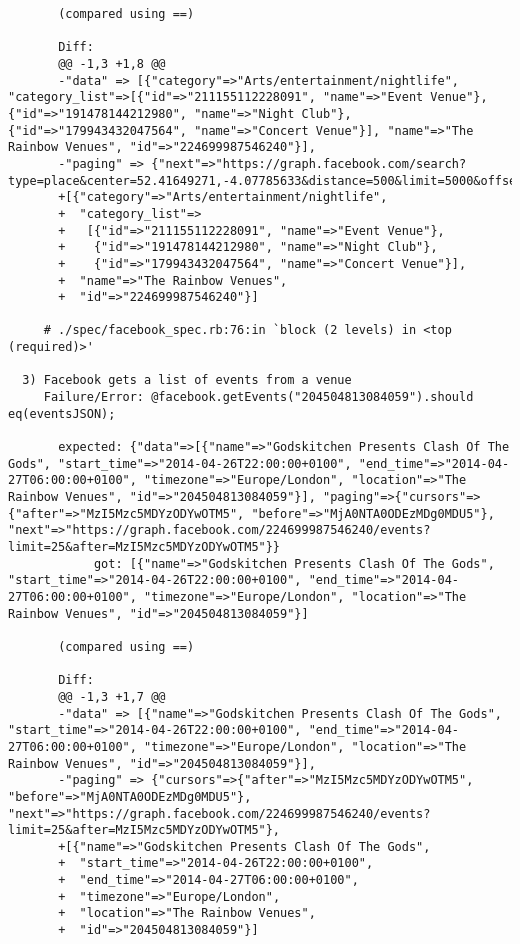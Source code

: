 \begin{lstlisting}
       (compared using ==)
       
       Diff:
       @@ -1,3 +1,8 @@
       -"data" => [{"category"=>"Arts/entertainment/nightlife", "category_list"=>[{"id"=>"211155112228091", "name"=>"Event Venue"}, {"id"=>"191478144212980", "name"=>"Night Club"}, {"id"=>"179943432047564", "name"=>"Concert Venue"}], "name"=>"The Rainbow Venues", "id"=>"224699987546240"}],
       -"paging" => {"next"=>"https://graph.facebook.com/search?type=place&center=52.41649271,-4.07785633&distance=500&limit=5000&offset=5000&__after_id=134964199922380"},
       +[{"category"=>"Arts/entertainment/nightlife",
       +  "category_list"=>
       +   [{"id"=>"211155112228091", "name"=>"Event Venue"},
       +    {"id"=>"191478144212980", "name"=>"Night Club"},
       +    {"id"=>"179943432047564", "name"=>"Concert Venue"}],
       +  "name"=>"The Rainbow Venues",
       +  "id"=>"224699987546240"}]
       
     # ./spec/facebook_spec.rb:76:in `block (2 levels) in <top (required)>'

  3) Facebook gets a list of events from a venue
     Failure/Error: @facebook.getEvents("204504813084059").should eq(eventsJSON);
       
       expected: {"data"=>[{"name"=>"Godskitchen Presents Clash Of The Gods", "start_time"=>"2014-04-26T22:00:00+0100", "end_time"=>"2014-04-27T06:00:00+0100", "timezone"=>"Europe/London", "location"=>"The Rainbow Venues", "id"=>"204504813084059"}], "paging"=>{"cursors"=>{"after"=>"MzI5Mzc5MDYzODYwOTM5", "before"=>"MjA0NTA0ODEzMDg0MDU5"}, "next"=>"https://graph.facebook.com/224699987546240/events?limit=25&after=MzI5Mzc5MDYzODYwOTM5"}}
            got: [{"name"=>"Godskitchen Presents Clash Of The Gods", "start_time"=>"2014-04-26T22:00:00+0100", "end_time"=>"2014-04-27T06:00:00+0100", "timezone"=>"Europe/London", "location"=>"The Rainbow Venues", "id"=>"204504813084059"}]
       
       (compared using ==)
       
       Diff:
       @@ -1,3 +1,7 @@
       -"data" => [{"name"=>"Godskitchen Presents Clash Of The Gods", "start_time"=>"2014-04-26T22:00:00+0100", "end_time"=>"2014-04-27T06:00:00+0100", "timezone"=>"Europe/London", "location"=>"The Rainbow Venues", "id"=>"204504813084059"}],
       -"paging" => {"cursors"=>{"after"=>"MzI5Mzc5MDYzODYwOTM5", "before"=>"MjA0NTA0ODEzMDg0MDU5"}, "next"=>"https://graph.facebook.com/224699987546240/events?limit=25&after=MzI5Mzc5MDYzODYwOTM5"},
       +[{"name"=>"Godskitchen Presents Clash Of The Gods",
       +  "start_time"=>"2014-04-26T22:00:00+0100",
       +  "end_time"=>"2014-04-27T06:00:00+0100",
       +  "timezone"=>"Europe/London",
       +  "location"=>"The Rainbow Venues",
       +  "id"=>"204504813084059"}]
       

\end{lstlisting}
